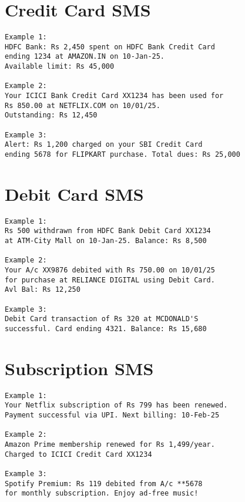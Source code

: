 \documentclass[11pt,a4paper]{report}
\begin{document}
\begin{itemize}
\section{Credit Card SMS}

\begin{lstlisting}
Example 1:
HDFC Bank: Rs 2,450 spent on HDFC Bank Credit Card 
ending 1234 at AMAZON.IN on 10-Jan-25. 
Available limit: Rs 45,000

Example 2:
Your ICICI Bank Credit Card XX1234 has been used for 
Rs 850.00 at NETFLIX.COM on 10/01/25. 
Outstanding: Rs 12,450

Example 3:
Alert: Rs 1,200 charged on your SBI Credit Card 
ending 5678 for FLIPKART purchase. Total dues: Rs 25,000
\end{lstlisting}

\section{Debit Card SMS}

\begin{lstlisting}
Example 1:
Rs 500 withdrawn from HDFC Bank Debit Card XX1234 
at ATM-City Mall on 10-Jan-25. Balance: Rs 8,500

Example 2:
Your A/c XX9876 debited with Rs 750.00 on 10/01/25 
for purchase at RELIANCE DIGITAL using Debit Card. 
Avl Bal: Rs 12,250

Example 3:
Debit Card transaction of Rs 320 at MCDONALD'S 
successful. Card ending 4321. Balance: Rs 15,680
\end{lstlisting}

\section{Subscription SMS}

\begin{lstlisting}
Example 1:
Your Netflix subscription of Rs 799 has been renewed. 
Payment successful via UPI. Next billing: 10-Feb-25

Example 2:
Amazon Prime membership renewed for Rs 1,499/year. 
Charged to ICICI Credit Card XX1234

Example 3:
Spotify Premium: Rs 119 debited from A/c **5678 
for monthly subscription. Enjoy ad-free music!
\end{lstlisting}



\end{itemize}
\end{document}
